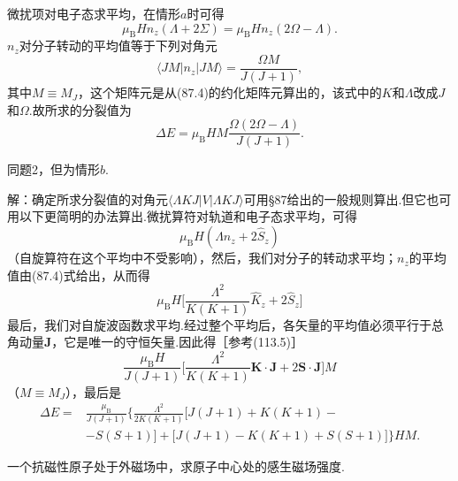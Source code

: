 \begin{xiti}
微扰项对电子态求平均，在情形$a$时可得
\begin{equation*}
  \mu_\mathrm{B}Hn_z(\Lambda+2\Sigma)=\mu_\mathrm{B}Hn_z(2\Omega-\Lambda).
\end{equation*}
$n_z$对分子转动的平均值等于下列对角元
\begin{equation*}
  \langle JM|n_z|JM\rangle=\frac{\Omega M}{J(J+1)},
\end{equation*}
其中$M\equiv M_J$，这个矩阵元是从(87.4)的约化矩阵元算出的，该式中的$K$和$\Lambda$改成$J$和$\Omega$.故所求的分裂值为
\begin{equation*}
  \Delta E=\mu_\mathrm{B}HM\frac{\Omega(2\Omega-\Lambda)}{J(J+1)}.
\end{equation*}

\quad 同题2，但为情形$b$.

解：确定所求分裂值的对角元$\langle\Lambda KJ|V|\Lambda KJ\rangle$可用§87给出的一般规则算出.但它也可用以下更简明的办法算出.微扰算符对轨道和电子态求平均，可得
\begin{equation*}
  \mu_\mathrm{B}H(\Lambda n_z+2\hat{S}_z)
\end{equation*}
（自旋算符在这个平均中不受影响），然后，我们对分子的转动求平均；$n_z$的平均值由(87.4)式给出，从而得
\begin{equation*}
  \mu_\mathrm{B}H\biggl[\frac{\Lambda^2}{K(K+1)}\hat{K}_z+2\hat{S}_z\biggr]
\end{equation*}
最后，我们对自旋波函数求平均.经过整个平均后，各矢量的平均值必须平行于总角动量$\boldsymbol{J}$，它是唯一的守恒矢量.因此得［参考(113.5)］
\begin{equation*}
  \frac{\mu_\mathrm{B}H}{J(J+1)}
  \biggl[\frac{\Lambda^2}{K(K+1)}\boldsymbol{K}\cdot\boldsymbol{J}
  +2\boldsymbol{S}\cdot\boldsymbol{J}\biggr]M
\end{equation*}
（$M\equiv M_J$），最后是
\begin{equation*}
\begin{aligned}
  \Delta E={}&\frac{\mu_\mathrm{B}}{J(J+1)}
  \biggl\{\frac{\Lambda^2}{2K(K+1)}
  \bigl[J(J+1)+K(K+1)-\\
  &-S(S+1)\bigr]
  +\bigl[J(J+1)-K(K+1)+S(S+1)\bigr]\biggr\}HM.
\end{aligned}
\end{equation*}

\quad 一个抗磁性原子处于外磁场中，求原子中心处的感生磁场强度.


\end{xiti}
